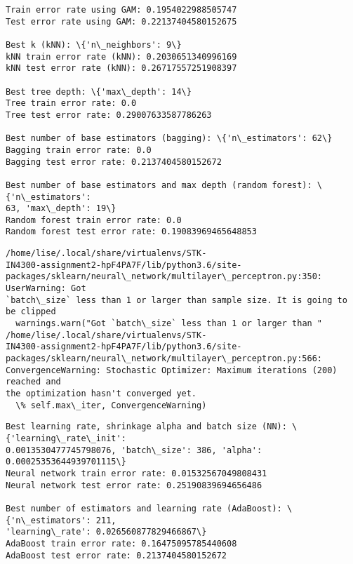 \documentclass[11pt]{article}
\begin{document}
    \begin{Verbatim}[commandchars=\\\{\}]
Train error rate using GAM: 0.1954022988505747
Test error rate using GAM: 0.22137404580152675

Best k (kNN): \{'n\_neighbors': 9\}
kNN train error rate (kNN): 0.2030651340996169
kNN test error rate (kNN): 0.26717557251908397

Best tree depth: \{'max\_depth': 14\}
Tree train error rate: 0.0
Tree test error rate: 0.29007633587786263

Best number of base estimators (bagging): \{'n\_estimators': 62\}
Bagging train error rate: 0.0
Bagging test error rate: 0.2137404580152672

Best number of base estimators and max depth (random forest): \{'n\_estimators':
63, 'max\_depth': 19\}
Random forest train error rate: 0.0
Random forest test error rate: 0.19083969465648853

    \end{Verbatim}

    \begin{Verbatim}[commandchars=\\\{\}]
/home/lise/.local/share/virtualenvs/STK-
IN4300-assignment2-hpF4PA7F/lib/python3.6/site-
packages/sklearn/neural\_network/multilayer\_perceptron.py:350: UserWarning: Got
`batch\_size` less than 1 or larger than sample size. It is going to be clipped
  warnings.warn("Got `batch\_size` less than 1 or larger than "
/home/lise/.local/share/virtualenvs/STK-
IN4300-assignment2-hpF4PA7F/lib/python3.6/site-
packages/sklearn/neural\_network/multilayer\_perceptron.py:566:
ConvergenceWarning: Stochastic Optimizer: Maximum iterations (200) reached and
the optimization hasn't converged yet.
  \% self.max\_iter, ConvergenceWarning)
    \end{Verbatim}

    \begin{Verbatim}[commandchars=\\\{\}]
Best learning rate, shrinkage alpha and batch size (NN): \{'learning\_rate\_init':
0.0013530477745798076, 'batch\_size': 386, 'alpha': 0.00025353644939701115\}
Neural network train error rate: 0.01532567049808431
Neural network test error rate: 0.25190839694656486

Best number of estimators and learning rate (AdaBoost): \{'n\_estimators': 211,
'learning\_rate': 0.026560877829466867\}
AdaBoost train error rate: 0.16475095785440608
AdaBoost test error rate: 0.2137404580152672

    \end{Verbatim}
\end{document}
